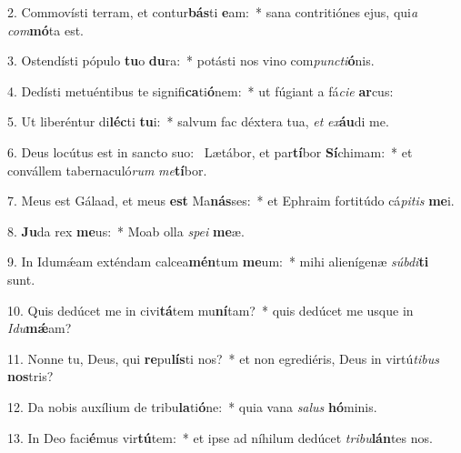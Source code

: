 2. Commovísti terram, et contur\textbf{bás}ti \textbf{e}am:~*  sana contritiónes ejus, qui\textit{a} \textit{com}\textbf{mó}ta est.\

3. Ostendísti pópulo \textbf{tu}o \textbf{du}ra:~*  potásti nos vino com\textit{punc}\textit{ti}\textbf{ó}nis.\

4. Dedísti metuéntibus te signifi\textbf{ca}ti\textbf{ó}nem:~*  ut fúgiant a fá\textit{ci}\textit{e} \textbf{ar}cus:\

5. Ut liberéntur di\textbf{léc}ti \textbf{tu}i:~*  salvum fac déxtera tua, \textit{et} \textit{ex}\textbf{áu}di me.\

6. Deus locútus est in sancto suo: \dag\  Lætábor, et par\textbf{tí}bor \textbf{Sí}chimam:~*  et convállem tabernaculó\textit{rum} \textit{me}\textbf{tí}bor.\

7. Meus est Gálaad, et meus \textbf{est} Ma\textbf{nás}ses:~*  et Ephraim fortitúdo cá\textit{pi}\textit{tis} \textbf{me}i.\

8. \textbf{Ju}da rex \textbf{me}us:~*  Moab olla \textit{spe}\textit{i} \textbf{me}æ.\

9. In Idumǽam exténdam calcea\textbf{mén}tum \textbf{me}um:~*  mihi alienígenæ \textit{súb}\textit{di}\textbf{ti} sunt.\

10. Quis dedúcet me in civi\textbf{tá}tem mu\textbf{ní}tam?~*  quis dedúcet me usque in \textit{I}\textit{du}\textbf{mǽ}am?\

11. Nonne tu, Deus, qui \textbf{re}pu\textbf{lís}ti nos?~*  et non egrediéris, Deus in virtú\textit{ti}\textit{bus} \textbf{nos}tris?\

12. Da nobis auxílium de tribu\textbf{la}ti\textbf{ó}ne:~*  quia vana \textit{sa}\textit{lus} \textbf{hó}minis.\

13. In Deo faci\textbf{é}mus vir\textbf{tú}tem:~*  et ipse ad níhilum dedúcet \textit{tri}\textit{bu}\textbf{lán}tes nos.\

